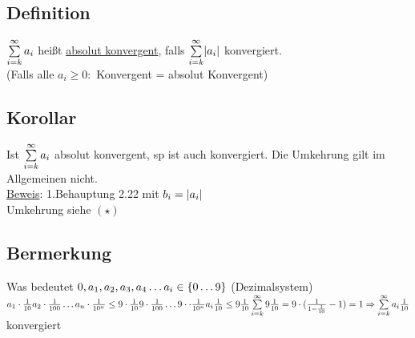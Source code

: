 \subsection{Definition}
$\sum\limits_{i=k}^{\infty} a_i$ hei\ss t \underline{absolut konvergent}, falls $\sum\limits_{i=k}^{\infty} \lvert a_i \rvert$ konvergiert. \\
(Falls alle $a_i \geq 0:$ Konvergent = absolut Konvergent)
\subsection{Korollar}
Ist $\sum\limits_{i=k}^{\infty} a_i$ absolut konvergent, sp ist auch konvergiert. Die Umkehrung gilt im Allgemeinen nicht.\\
\underline{Beweis}: 1.Behauptung 2.22 mit $b_i = \lvert a_i \rvert$\\
Umkehrung siehe $(\star)$
\subsection*{Bermerkung}
Was bedeutet $0,a_1,a_2,a_3,a_4 \ldots\\
a_i \in \{0 \ldots 9\}$ (Dezimalsystem)\\
$a_1 \cdot \frac{1}{10} a_2 \cdot \frac{1}{100} \ldots a_n \cdot \frac{1}{10^n} \leq 9 \cdot \frac{1}{10} 9 \cdot \frac{1}{100} \ldots 9 \cdot \cdot \frac{1}{10^n}\\
a_i \frac{1}{10} \leq 9 \frac{1}{10}\\
\sum\limits_{i=k}^{\infty} 9 \frac{1}{10} = 9 \cdot (\frac{1}{1-\frac{1}{10}}-1) = 1 \Rightarrow \sum\limits_{i=k}^{\infty} a_i \frac{1}{10}$ konvergiert
